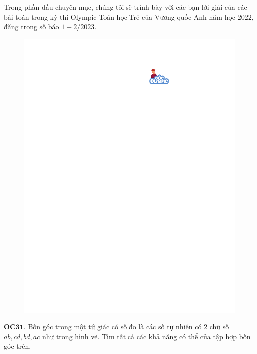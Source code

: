 \begin{multicols}{2}
	Trong phần đầu chuyên mục, chúng tôi sẽ trình bày với các bạn lời giải của các bài toán trong kỳ thi Olympic Toán học Trẻ của Vương quốc Anh năm học $2022$, đăng trong số báo $1-2/2023$. 
	\begin{figure}[H]
		\vspace*{-5pt}
		\centering
		\captionsetup{labelformat= empty, justification=centering}
		\includegraphics[width= 1\linewidth]{gocolympic}
		\vspace*{-15pt}
	\end{figure}
	{\bf\color{cackithi} OC$\pmb{31.}$} Bốn góc trong một tứ giác có số đo là các số tự nhiên có $2$ chữ số $\overline{ab}, \overline{cd}, \overline{bd}, \overline{ac}$ như trong hình vẽ. Tìm tất cả các khả năng có thể của tập hợp bốn góc trên.
	\begin{figure}[H]
		\vspace*{-5pt}
		\centering
		\captionsetup{labelformat= empty, justification=centering}

\end{figure}
\end{multicols}
